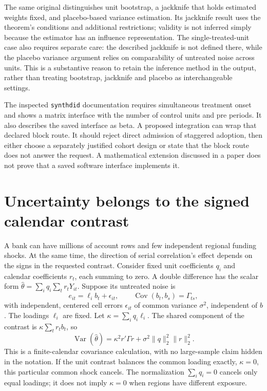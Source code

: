The same original distinguishes unit bootstrap, a jackknife that holds
estimated weights fixed, and placebo-based variance estimation. Its
jackknife result uses the theorem's conditions and additional restrictions;
validity is not inferred simply because the estimator has an influence
representation. The single-treated-unit case also requires separate care:
the described jackknife is not defined there, while the placebo
variance argument relies on comparability of untreated noise across
units. This is a substantive reason to retain the inference method in
the output, rather than treating bootstrap, jackknife and placebo as
interchangeable settings.~\citep{synthdid2021}

The inspected \texttt{synthdid} documentation requires simultaneous
treatment onset and shows a matrix interface with the number of control
units and pre periods. It also describes the saved interface as beta.
A proposed integration can wrap that declared block route. It should
reject direct admission of staggered adoption, then either choose a
separately justified cohort design or state that the block route does not
answer the request. A mathematical extension discussed in a paper does
not prove that a saved software interface implements it.~\citep{sw_synthdid}

\section{Uncertainty belongs to the signed calendar contrast}
\label{exec17:s6-calendar}

A bank can have millions of account rows and few independent regional
funding shocks. At the same time, the direction of serial correlation's
effect depends on the signs in the requested contrast. Consider fixed
unit coefficients $q_i$ and calendar coefficients $r_t$, each summing
to zero. A double difference has the scalar form
$\widehat\theta=\sum_iq_i\sum_tr_tY_{it}$. Suppose its untreated
noise is
\begin{equation}
 e_{it}=\ell_i b_t+\epsilon_{it},\qquad
 \operatorname{Cov}(b_t,b_s)=\Gamma_{ts},
 \label{exec17:s6-shared-law}
\end{equation}
with independent, centered cell errors $\epsilon_{it}$ of common
variance $\sigma^2$, independent of $b$. The loadings $\ell_i$ are
fixed. Let $\kappa=\sum_iq_i\ell_i$. The shared component of the
contrast is $\kappa\sum_tr_tb_t$, so
\begin{equation}
 \operatorname{Var}(\widehat\theta)
   =\kappa^2 r'\Gamma r+\sigma^2\|q\|_2^2\|r\|_2^2.
 \label{exec17:s6-signed-variance}
\end{equation}
This is a finite-calendar covariance calculation, with no large-sample
claim hidden in the notation. If the unit contrast balances the common
loading exactly, $\kappa=0$, this particular common shock cancels.
The normalization $\sum_iq_i=0$ cancels only equal loadings; it does
not imply $\kappa=0$ when regions have different exposure.

